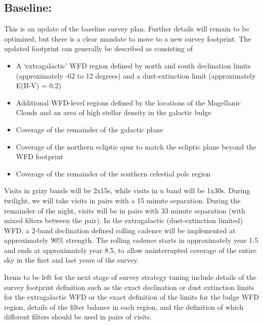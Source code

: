 \subsection{Baseline: }
This is an update of the baseline survey plan. Further details will remain to be optimized, but there is a clear mandate to move to a new survey footprint. The updated footprint can generally be described as consisting of 
\begin{itemize}
\item A ‘extragalactic’  WFD region defined by north and south declination limits (approximately -62 to 12 degrees) and a dust-extinction limit (approximately E(B-V) = 0.2)
\item Additional WFD-level regions defined by the locations of the Magellanic Clouds and an area of high stellar density in the galactic bulge 
\item Coverage of the remainder of the galactic plane
\item Coverage of the northern ecliptic spur to match the ecliptic plane beyond the WFD footprint
\item Coverage of the remainder of the southern celestial pole region
\end{itemize}
Visits in grizy bands will be 2x15s, while visits in u band will be 1x30s. During twilight, we will take visits in pairs with a 15 minute separation. During the remainder of the night, visits will be in pairs with 33 minute separation (with mixed filters between the pair).  
In the extragalactic (dust-extinction limited) WFD, a 2-band declination defined rolling cadence will be implemented at approximately 90\% strength. The rolling cadence starts in approximately year 1.5 and ends at approximately year 8.5, to allow uninterrupted coverage of the entire sky in the first and last years of the survey. 

Items to be left for the next stage of survey strategy tuning include details of the survey footprint definition such as the exact declination or dust extinction limits for the extragalactic WFD or the exact definition of the limits for the bulge WFD region, details of the filter balance in each region, and the definition of which different filters should be used in pairs of visits.

